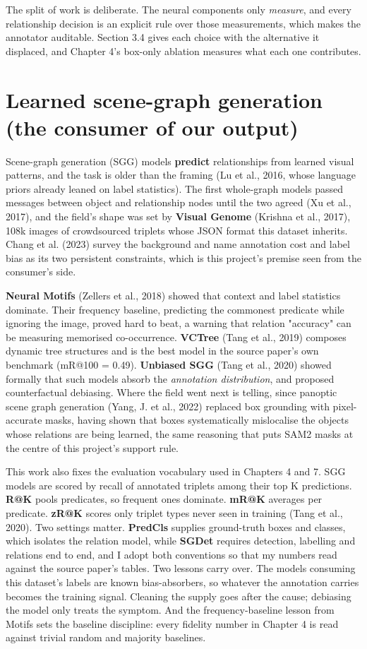 The split of work is deliberate. The neural components only \textit{measure}, and every relationship decision is an explicit rule over those measurements, which makes the annotator auditable. Section 3.4 gives each choice with the alternative it displaced, and Chapter 4's box-only ablation measures what each one contributes.

\section{Learned scene-graph generation (the consumer of our output)}

Scene-graph generation (SGG) models \textbf{predict} relationships from learned visual patterns, and the task is older than the framing (Lu et al., 2016, whose language priors already leaned on label statistics). The first whole-graph models passed messages between object and relationship nodes until the two agreed (Xu et al., 2017), and the field's shape was set by \textbf{Visual Genome} (Krishna et al., 2017), 108k images of crowdsourced triplets whose JSON format this dataset inherits. Chang et al. (2023) survey the background and name annotation cost and label bias as its two persistent constraints, which is this project's premise seen from the consumer's side.

\textbf{Neural Motifs} (Zellers et al., 2018) showed that context and label statistics dominate. Their frequency baseline, predicting the commonest predicate while ignoring the image, proved hard to beat, a warning that relation "accuracy" can be measuring memorised co-occurrence. \textbf{VCTree} (Tang et al., 2019) composes dynamic tree structures and is the best model in the source paper's own benchmark (mR@100 = 0.49). \textbf{Unbiased SGG} (Tang et al., 2020) showed formally that such models absorb the \textit{annotation distribution}, and proposed counterfactual debiasing. Where the field went next is telling, since panoptic scene graph generation (Yang, J. et al., 2022) replaced box grounding with pixel-accurate masks, having shown that boxes systematically mislocalise the objects whose relations are being learned, the same reasoning that puts SAM2 masks at the centre of this project's support rule.

This work also fixes the evaluation vocabulary used in Chapters 4 and 7. SGG models are scored by recall of annotated triplets among their top K predictions. \textbf{R@K} pools predicates, so frequent ones dominate. \textbf{mR@K} averages per predicate. \textbf{zR@K} scores only triplet types never seen in training (Tang et al., 2020). Two settings matter. \textbf{PredCls} supplies ground-truth boxes and classes, which isolates the relation model, while \textbf{SGDet} requires detection, labelling and relations end to end, and I adopt both conventions so that my numbers read against the source paper's tables. Two lessons carry over. The models consuming this dataset's labels are known bias-absorbers, so whatever the annotation carries becomes the training signal. Cleaning the supply goes after the cause; debiasing the model only treats the symptom. And the frequency-baseline lesson from Motifs sets the baseline discipline: every fidelity number in Chapter 4 is read against trivial random and majority baselines.

